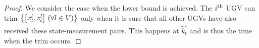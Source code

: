 	\begin{proof}
		We consider the case when the lower bound is achieved.
		The $i^\text{th}$ UGV can trim $\left\lbrace\left[x^l_t,z^l_t\right] \,(\forall l\in V)\right\rbrace$ only when it is sure that all other UGVs have also received these state-measurement pairs.
		This happens at $\tilde{k}^i_t$ and is thus the time when the trim occurs. 
		
		
		
	\end{proof}
	
	
%	
	

